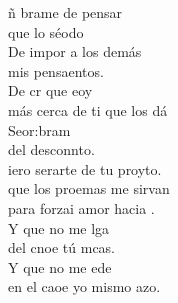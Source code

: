 \begin{cancion}%
	ñ brame de pensar   \\
	que lo séodo\\
	De impor a los demás \\
	mis pensaentos.\\
	De cr que eoy\\
	más cerca de ti que los dá\\
	Seor:bram\\
	del desconnto.   \\
	iero serarte de tu proyto.\\
	que los proemas me sirvan\\
	para forzai amor hacia . \\
	Y que no me lga \\
	del cnoe tú mcas.\\
	Y que no me ede\\
	en el caoe yo mismo azo.\\
\end{cancion}%
